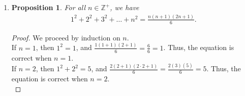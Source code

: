 \documentclass{article}
\newtheorem{prop}[thm]{Proposition}
\begin{document}
\begin{enumerate}
\begin{enumerate}
\begin{proof}
        Therefore, $f$ does not have to be surjective.
    \end{proof}
    
    \item \begin{prop}
        If $g \circ f$ is surjective, then $g$ is surjective.
    \end{prop}
    \begin{proof}
        We will prove by contradiction. Suppose for the sake of contradiction that there exists some $z \in C$ such that for all $k \in B$, $g(k) \neq z$. \\
        
        Since $g \circ f$ is surjective, we know that there exist some $x \in A$ such that $g \circ f(x) = z$. Let $y = f(x)$, $y \in B$. We then have
        \begin{align}
            g \circ f(x) &= g(f(x)) \\
                         &= g(y) \\
                         &= z
        \end{align}
        This shows that there exists some $y \in B$ such that $g(y) = z$. However, this contradicts our assumption that for all $k \in B$, $g(k) \neq z$. \\
        
        Therefore, $g$ is surjective.
    \end{proof}
\end{enumerate}

\item 
\begin{prop}
  For all $n \in \mathbb{Z}^{+}$, we have 
  \begin{gather}
      1^2 + 2^2 + 3^2 + \ldots + n^2 = \frac{n(n+1)(2n+1)}{6}.
  \end{gather}
\end{prop}
\begin{proof}
    We proceed by induction on $n$.\\
    
    If $n = 1$, then $1^2 = 1$, and $\frac{1(1+1)(2+1)}{6} = \frac{6}{6} = 1$. Thus, the equation is correct when $n = 1$. \\
    If $n = 2$, then $1^2 + 2^2 = 5$, and $\frac{2(2+1)(2\cdot2+1)}{6} = \frac{2(3)(5)}{6} = 5$. Thus, the equation is correct when $n = 2$. \\
    

\end{proof}
\end{enumerate}
\end{document}
